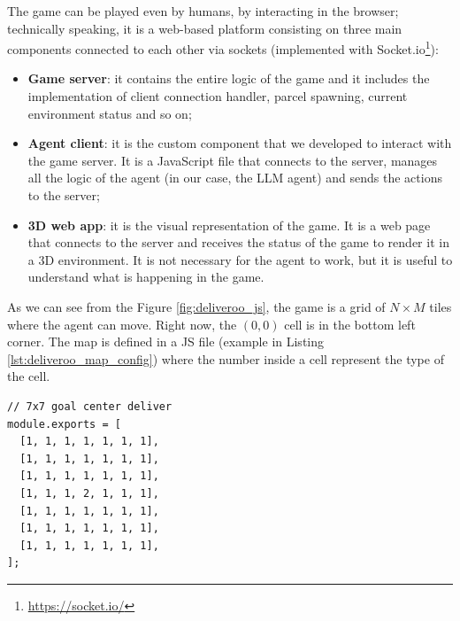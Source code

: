 The game can be played even by humans, by interacting in the browser;
technically speaking, it is a web-based platform consisting on three main components
connected to each other via sockets (implemented with Socket.io\footnote{\url{https://socket.io/}}):
\begin{itemize}
  \item \textbf{Game server}: it contains the entire logic of the game and it includes
    the implementation of client connection handler, parcel spawning, current environment
    status and so on;

  \item \textbf{Agent client}: it is the custom component that we developed to interact
    with the game server. It is a JavaScript file that connects to the server, manages
    all the logic of the agent (in our case, the LLM agent) and sends the
    actions to the server;

  \item \textbf{3D web app}: it is the visual representation of the game. It is
    a web page that connects to the server and receives the status of the game
    to render it in a 3D environment. It is not necessary for the agent to work,
    but it is useful to understand what is happening in the game.
\end{itemize}

As we can see from the Figure \ref{fig:deliveroo_js}, the game is a grid of $N \times
M$ tiles where the agent can move. Right now, the $(0, 0)$ cell is in the bottom
left corner. The map is defined in a JS file (example in Listing \ref{lst:deliveroo_map_config})
where the number inside a cell represent the type of the cell.

\vspace{10mm}
\begin{codewindow}
    \begin{lstlisting}
// 7x7 goal center deliver
module.exports = [
  [1, 1, 1, 1, 1, 1, 1],
  [1, 1, 1, 1, 1, 1, 1],
  [1, 1, 1, 1, 1, 1, 1],
  [1, 1, 1, 2, 1, 1, 1],
  [1, 1, 1, 1, 1, 1, 1],
  [1, 1, 1, 1, 1, 1, 1],
  [1, 1, 1, 1, 1, 1, 1],
];
\end{lstlisting}
\end{codewindow}
\vspace{10mm}

